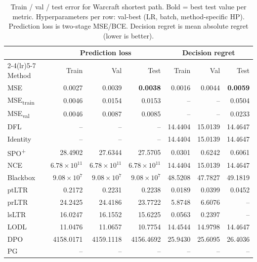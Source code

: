 \begin{table}[t]
\centering
\caption{Train / val / test error for Warcraft shortest path. Bold = best test value per metric. Hyperparameters per row: val-best (LR, batch, method-specific HP). Prediction loss is two-stage MSE/BCE. Decision regret is mean absolute regret (lower is better).}
\label{tab:err-shortestpath}
\setlength{\tabcolsep}{4pt}
\renewcommand{\arraystretch}{1.05}
\begin{tabular}{@{}lrrrrrr@{}}
\toprule
& \multicolumn{3}{c}{Prediction loss} & \multicolumn{3}{c}{Decision regret} \\
\cmidrule(lr){2-4}\cmidrule(lr){5-7}
Method & Train & Val & Test & Train & Val & Test \\
\midrule
MSE & 0.0027 & 0.0039 & \textbf{0.0038} & 0.0016 & 0.0044 & \textbf{0.0059} \\
MSE\textsubscript{train} & 0.0046 & 0.0154 & 0.0153 & -- & -- & 0.0504 \\
MSE\textsubscript{val} & 0.0046 & 0.0087 & 0.0085 & -- & -- & 0.0233 \\
DFL & -- & -- & -- & 14.4404 & 15.0139 & 14.4647 \\
Identity & -- & -- & -- & 14.4404 & 15.0139 & 14.4647 \\
SPO\textsuperscript{+} & 28.4902 & 27.6344 & 27.5705 & 0.0301 & 0.6242 & 0.6061 \\
NCE & $6.78{\times}10^{11}$ & $6.78{\times}10^{11}$ & $6.78{\times}10^{11}$ & 14.4404 & 15.0139 & 14.4647 \\
Blackbox & $9.08{\times}10^{7}$ & $9.08{\times}10^{7}$ & $9.08{\times}10^{7}$ & 48.5208 & 47.7827 & 49.1819 \\
ptLTR & 0.2172 & 0.2231 & 0.2238 & 0.0189 & 0.0399 & 0.0452 \\
prLTR & 24.2425 & 24.4186 & 23.7722 & 5.8748 & 6.6076 & -- \\
lsLTR & 16.0247 & 16.1552 & 15.6225 & 0.0563 & 0.2397 & -- \\
LODL & 11.0476 & 11.0657 & 10.7754 & 14.4544 & 14.9798 & 14.4647 \\
DPO & 4158.0171 & 4159.1118 & 4156.4692 & 25.9430 & 25.6095 & 26.4036 \\
PG & -- & -- & -- & -- & -- & -- \\
\bottomrule
\end{tabular}
\end{table}
